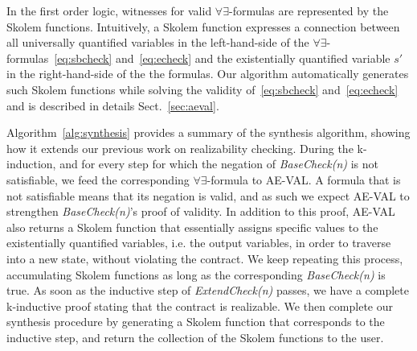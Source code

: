 In the first order logic, witnesses for valid $\forall\exists$-formulas are represented by the Skolem functions.
Intuitively, a Skolem function expresses a connection between all universally quantified variables in the left-hand-side of the $\forall\exists$-formulas~\eqref{eq:sbcheck} and~\eqref{eq:echeck} and the existentially quantified variable $s'$ in the right-hand-side of the the formulas.
Our algorithm automatically generates such Skolem functions
while solving the validity of~\eqref{eq:sbcheck} and~\eqref{eq:echeck} and is described in details Sect.~\ref{sec:aeval}.

\synthesisalgorithm


Algorithm~\ref{alg:synthesis} provides a summary of the synthesis algorithm,
showing how it extends our previous work on realizability checking. During the
k-induction, and for every step for which the negation of \textit{BaseCheck(n)}
is not satisfiable, we feed the corresponding $\forall\exists$-formula to
AE-VAL. A formula that is not satisfiable means that its negation is valid, and
as such we expect AE-VAL to strengthen \textit{BaseCheck(n)}'s
proof of validity. In addition to this proof, AE-VAL also returns a
Skolem function that essentially assigns specific values to the existentially quantified
variables, i.e. the output variables, in order to traverse into a
new state, without violating the contract. We keep repeating this process,
accumulating Skolem functions as long as the corresponding
\textit{BaseCheck(n)} is true. As soon as the inductive
step of \textit{ExtendCheck(n)} passes, we have a complete k-inductive proof
stating that the contract is realizable. We then complete our synthesis
procedure by generating a Skolem function that corresponds to the inductive
step, and return the collection of the Skolem functions to the user.




%
%

